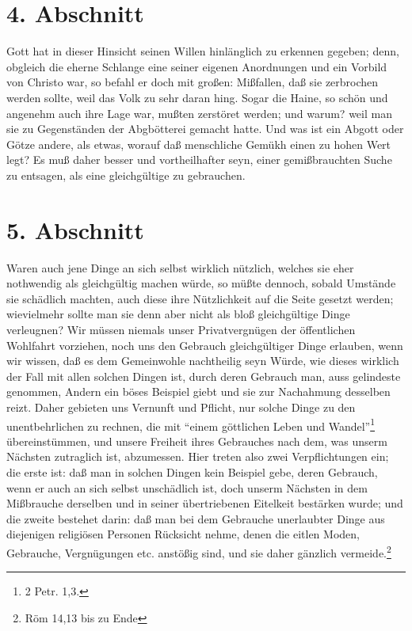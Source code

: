 \section{4. Abschnitt} \label{kap18_ab4}

Gott hat in dieser Hinsicht seinen Willen hinlänglich zu erkennen gegeben; denn,
obgleich die eherne Schlange eine seiner eigenen Anordnungen und ein Vorbild von
Christo war, so befahl er doch mit großen: Mißfallen, daß sie zerbrochen werden
sollte, weil das Volk zu sehr daran hing. Sogar die Haine, so schön und angenehm
auch ihre Lage war, mußten zerstöret werden; und warum? weil man sie zu
Gegenständen der Abgbötterei gemacht hatte. Und was ist ein Abgott oder Götze
andere, als etwas, worauf daß menschliche Gemükh einen zu hohen Wert legt? Es
muß daher besser und vortheilhafter seyn, einer gemißbrauchten Suche zu
entsagen, als eine gleichgültige zu gebrauchen.

\section{5. Abschnitt} \label{kap18_ab5}

Waren auch jene Dinge an sich selbst wirklich nützlich, welches sie eher
nothwendig als gleichgültig machen würde, so müßte dennoch, sobald Umstände sie
schädlich machten, auch diese ihre Nützlichkeit auf die Seite gesetzt werden;
wievielmehr sollte man sie denn aber nicht als bloß gleichgültige Dinge
verleugnen? Wir müssen niemals unser Privatvergnügen der öffentlichen Wohlfahrt
vorziehen, noch uns den Gebrauch gleichgültiger Dinge erlauben, wenn wir wissen,
daß es dem Gemeinwohle nachtheilig seyn Würde, wie dieses wirklich der Fall mit
allen solchen Dingen ist, durch deren Gebrauch man, auss gelindeste genommen,
Andern ein böses Beispiel giebt und sie zur Nachahmung desselben reizt. Daher
gebieten uns Vernunft und Pflicht, nur solche Dinge zu den unentbehrlichen zu
rechnen, die mit "`einem göttlichen Leben und Wandel"'\footnote{2 Petr. 1,3.}
übereinstümmen, und unsere Freiheit ihres Gebrauches nach dem, was unserm
Nächsten zutraglich ist, abzumessen. Hier treten also zwei Verpflichtungen ein;
die erste ist: daß man in solchen Dingen kein Beispiel gebe, deren Gebrauch,
wenn er auch an sich selbst unschädlich ist, doch unserm Nächsten in dem
Mißbrauche derselben und in seiner übertriebenen Eitelkeit bestärken wurde; und
die zweite bestehet darin: daß man bei dem Gebrauche unerlaubter Dinge aus
diejenigen religiösen Personen Rücksicht nehme, denen die eitlen Moden,
Gebrauche, Vergnügungen etc. anstößig sind, und sie daher gänzlich
vermeide.\footnote{Röm 14,13 bis zu Ende}


